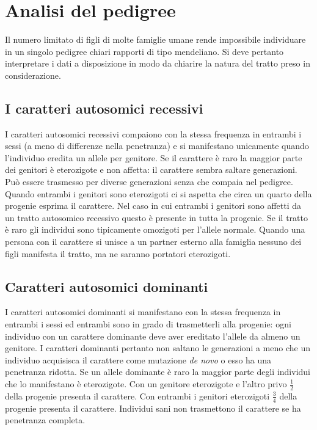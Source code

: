 \section{Analisi del pedigree}
Il numero limitato di figli di molte famiglie umane rende impossibile individuare in un singolo pedigree chiari rapporti di tipo mendeliano. Si deve pertanto interpretare i dati a disposizione in modo da
chiarire la natura del tratto preso in considerazione.

	\subsection{I caratteri autosomici recessivi}
	I caratteri autosomici recessivi compaiono con la stessa frequenza in entrambi i sessi (a meno di differenze nella penetranza) e si manifestano unicamente quando l'individuo eredita un allele per genitore.
	Se il carattere \`e raro la maggior parte dei genitori \`e eterozigote e non affetta: il carattere sembra saltare generazioni. 
	Pu\`o essere trasmesso per diverse generazioni senza che compaia nel pedigree.
	Quando entrambi i genitori sono eterozigoti ci si aspetta che circa un quarto della progenie esprima il carattere.
	Nel caso in cui entrambi i genitori sono affetti da un tratto autosomico recessivo questo \`e presente in tutta la progenie. 
	Se il tratto \`e raro gli individui sono tipicamente omozigoti per l'allele normale. 
	Quando una persona con il carattere si unisce a un partner esterno alla famiglia nessuno dei figli manifesta il tratto, ma ne saranno portatori eterozigoti. 

	\subsection{Caratteri autosomici dominanti}
	I caratteri autosomici dominanti si manifestano con la stessa frequenza in entrambi i sessi ed entrambi sono in grado di trasmetterli alla progenie: ogni individuo con un carattere dominante deve aver ereditato l'allele da almeno un genitore.
	I caratteri dominanti pertanto non saltano le generazioni a meno che un individuo acquisisca il carattere come mutazione \emph{de novo} o esso ha una penetranza ridotta.
	Se un allele dominante \`e raro la maggior parte degli individui che lo manifestano \`e eterozigote.
	Con un genitore eterozigote e l'altro privo $\frac{1}{2}$ della progenie presenta il carattere.
	Con entrambi i genitori eterozigoti $\frac{3}{4}$ della progenie presenta il carattere. 
	Individui sani non trasmettono il carattere se ha penetranza completa.

